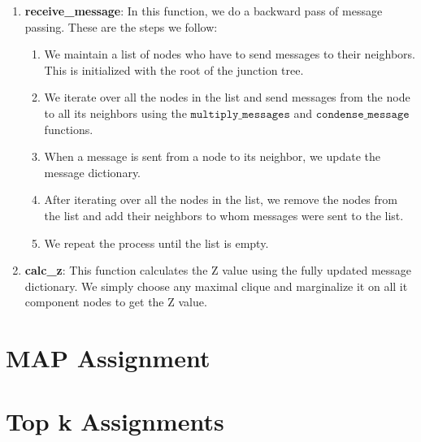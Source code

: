 \documentclass[12pt]{article}
\begin{document}
\begin{enumerate}
    \item \textbf{receive\_message}: In this function, we do a backward pass of message passing. These are the steps we follow:
        \begin{enumerate}
            \item We maintain a list of nodes who have to send messages to their neighbors. This is initialized with the root of the junction tree.
            \item We iterate over all the nodes in the list and send messages from the node to all its neighbors using the $\texttt{multiply\_messages}$ and $\texttt{condense\_message}$ functions.
            \item When a message is sent from a node to its neighbor, we update the message dictionary.
            \item After iterating over all the nodes in the list, we remove the nodes from the list and add their neighbors to whom messages were sent to the list.
            \item We repeat the process until the list is empty.
        \end{enumerate}
    
    \item \textbf{calc\_z}: This function calculates the Z value using the fully updated message dictionary. We simply choose any maximal clique and marginalize it on all it component nodes to get the Z value.
    
\end{enumerate}




\section{MAP Assignment}
\section{Top k Assignments}
\end{document}
